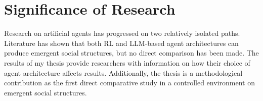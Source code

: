 \section{Significance of Research}
Research on artificial agents has progressed on two relatively isolated paths. Literature has shown that both RL and LLM-based agent architectures can produce emergent social structures, but no direct comparison has been made. The results of my thesis provide researchers with information on how their choice of agent architecture affects results. Additionally, the thesis is a methodological contribution as the first direct comparative study in a controlled environment on emergent social structures.